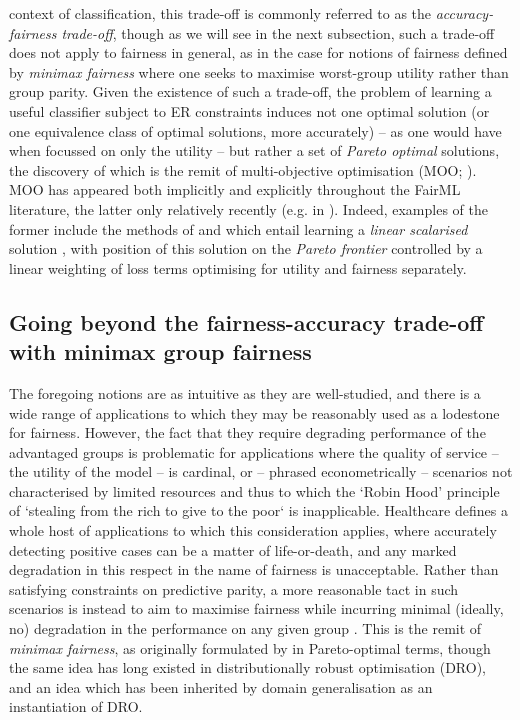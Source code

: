 context of classification, this trade-off is commonly referred to as the \emph{accuracy-fairness
trade-off}, though as we will see in the next subsection, such a trade-off does not apply to
fairness in general, as in the case for notions of fairness defined by \emph{minimax fairness}
where one seeks to maximise worst-group utility rather than group parity.
%
Given the existence of such a trade-off, the problem of learning a useful classifier subject to ER
constraints induces not one optimal solution (or one equivalence class of optimal solutions, more
accurately) -- as one would have when focussed on only the utility -- but rather a set of
\emph{Pareto optimal} solutions, the discovery of which is the remit of multi-objective
optimisation (MOO; \cite{sawaragi1985theory, deb2013multi}). 
%
MOO has appeared both implicitly and explicitly throughout the FairML literature, the latter only
relatively recently (e.g. in \cite{navon2020learning}). 
%
Indeed, examples of the former include the methods of \cite{louizos2015variational} and
\cite{madras2018learning} which entail learning a \emph{linear scalarised} solution
\citep{boyd2004convex},  with position of this solution on the \emph{Pareto frontier} controlled by
a linear weighting of loss terms optimising for utility and fairness separately.
%
\subsection{Going beyond the fairness-accuracy trade-off with minimax group
fairness}\label{ssec:minimax-fairness}
The foregoing notions are as intuitive as they are well-studied, and there is a wide
range of applications to which they may be reasonably used as a lodestone for fairness.
%
However, the fact that they require degrading performance of the advantaged groups is problematic
for applications where the quality of service -- the utility of the model -- is cardinal, or --
phrased econometrically -- scenarios not characterised by limited resources  and thus to which the
`Robin Hood' principle of `stealing from the rich to give to the poor` is inapplicable.
%
Healthcare defines a whole host of applications to which this consideration applies, where
accurately detecting positive cases can be a matter of life-or-death, and any marked degradation in
this respect in the name of fairness is unacceptable. 
%
Rather than satisfying constraints on predictive parity, a more reasonable tact in such scenarios
is instead to aim to maximise fairness while incurring minimal (ideally, no) degradation in the
performance on any given group \citep{ustun2019fairness}.
%
This is the remit of \emph{minimax fairness}, as originally formulated by
\citep{martinez2020minimax} in Pareto-optimal terms, though the same idea has long existed in
distributionally robust optimisation (DRO), and an idea which has been inherited by domain
generalisation as an instantiation of DRO. 
%

